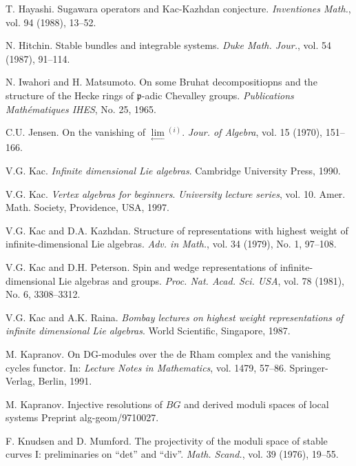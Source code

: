\begin{description}[leftmargin=3.2em,itemsep=2pt]
\item[{[Ha88]}] T. Hayashi. Sugawara operators and Kac-Kazhdan conjecture. \emph{Inventiones Math.}, vol. 94 (1988), 13--52.
\item[{[Hit87]}] N. Hitchin. Stable bundles and integrable systems. \emph{Duke Math. Jour.}, vol. 54 (1987), 91--114.
\item[{[IM]}] N. Iwahori and H. Matsumoto. On some Bruhat decompositiopns and the structure of the Hecke rings of $\mathfrak{p}$-adic Chevalley groups. \emph{Publications Mathématiques IHES}, No. 25, 1965.
\item[{[J]}] C.U. Jensen. On the vanishing of $\lim\limits_{\longleftarrow}{}^{(i)}$. \emph{Jour. of Algebra}, vol. 15 (1970), 151--166.
\item[{[Kac90]}] V.G. Kac. \emph{Infinite dimensional Lie algebras}. Cambridge University Press, 1990.
\item[{[Kac97]}] V.G. Kac. \emph{Vertex algebras for beginners}. \emph{University lecture series}, vol. 10. Amer. Math. Society, Providence, USA, 1997.
\item[{[KK]}] V.G. Kac and D.A. Kazhdan. Structure of representations with highest weight of infinite-dimensional Lie algebras. \emph{Adv. in Math.}, vol. 34 (1979), No. 1, 97--108.
\item[{[KP]}] V.G. Kac and D.H. Peterson. Spin and wedge representations of infinite-dimensional Lie algebras and groups. \emph{Proc. Nat. Acad. Sci. USA}, vol. 78 (1981), No. 6, 3308--3312.
\item[{[KR]}] V.G. Kac and A.K. Raina. \emph{Bombay lectures on highest weight representations of infinite dimensional Lie algebras}. World Scientific, Singapore, 1987.
\item[{[Kap91]}] M. Kapranov. On DG-modules over the de Rham complex and the vanishing cycles functor. In: \emph{Lecture Notes in Mathematics}, vol. 1479, 57--86. Springer-Verlag, Berlin, 1991.
\item[{[Kap97]}] M. Kapranov. Injective resolutions of $BG$ and derived moduli spaces of local systems Preprint alg-geom/9710027.
\item[{[Kn-Mu]}] F. Knudsen and D. Mumford. The projectivity of the moduli space of stable curves I: preliminaries on ``det'' and ``div''. \emph{Math. Scand.}, vol. 39 (1976), 19--55.

\end{description}

